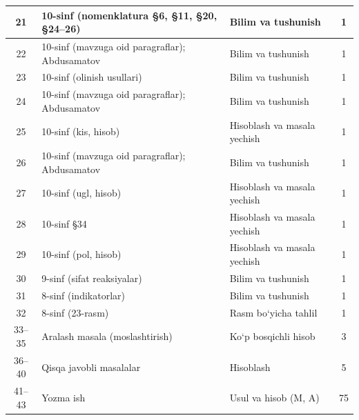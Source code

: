 \documentclass[11pt,a4paper]{article}
\begin{document}
{\begin{longtable}{|c|p{7.2cm}|p{5.4cm}|c|}
21 & 10-sinf (nomenklatura \S{}6, \S{}11, \S{}20, \S{}24--26) & Bilim va tushunish & 1\\\hline
22 & 10-sinf (mavzuga oid paragraflar); Abdusamatov & Bilim va tushunish & 1\\\hline
23 & 10-sinf (olinish usullari) & Bilim va tushunish & 1\\\hline
24 & 10-sinf (mavzuga oid paragraflar); Abdusamatov & Bilim va tushunish & 1\\\hline
25 & 10-sinf (kis, hisob) & Hisoblash va masala yechish & 1\\\hline
26 & 10-sinf (mavzuga oid paragraflar); Abdusamatov & Bilim va tushunish & 1\\\hline
27 & 10-sinf (ugl, hisob) & Hisoblash va masala yechish & 1\\\hline
28 & 10-sinf \S{}34 & Hisoblash va masala yechish & 1\\\hline
29 & 10-sinf (pol, hisob) & Hisoblash va masala yechish & 1\\\hline
30 & 9-sinf (sifat reaksiyalar) & Bilim va tushunish & 1\\\hline
31 & 8-sinf (indikatorlar) & Bilim va tushunish & 1\\\hline
32 & 8-sinf (23-rasm) & Rasm bo`yicha tahlil & 1\\\hline
33--35 & Aralash masala (moslashtirish) & Ko`p bosqichli hisob & 3\\\hline
36--40 & Qisqa javobli masalalar & Hisoblash & 5\\\hline
41--43 & Yozma ish & Usul va hisob (M, A) & 75\\\hline
\end{longtable}}
\end{document}
